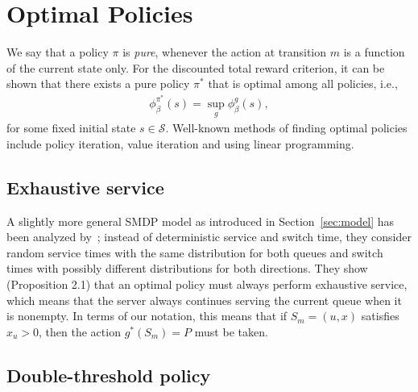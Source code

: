 \documentclass{article}
\theoremstyle{definition}
\theoremstyle{plain}
\begin{document}
\section{Optimal Policies}

We say that a policy $\pi$ is \textit{pure}, whenever the action at transition $m$ is
a function of the current state only. For the discounted total reward criterion,
it can be shown that there exists a pure policy $\pi^{*}$ that is optimal among
all policies, i.e.,
\begin{align}
  \phi_{\beta}^{\pi^{*}}(s) = \sup_{g} \phi_{\beta}^{g}(s) ,
\end{align}
for some fixed initial state $s \in \mathcal{S}$. Well-known methods of finding
optimal policies include policy iteration, value iteration and using linear
programming.

\subsection{Exhaustive service}

A slightly more general SMDP model as introduced in Section~\ref{sec:model} has
been analyzed by~\cite{hofriOptimalControlTwo1987}; instead of deterministic
service and switch time, they consider random service times with the same
distribution for both queues and switch times with possibly different
distributions for both directions. They show (Proposition 2.1) that an optimal
policy must always perform exhaustive service, which means that the server
always continues serving the current queue when it is nonempty. In terms of our
notation, this means that if $S_{m} = (u, x)$ satisfies $x_{u} > 0$, then the
action $g^{*}(S_{m}) = P$ must be taken.

\subsection{Double-threshold policy}
\end{document}
